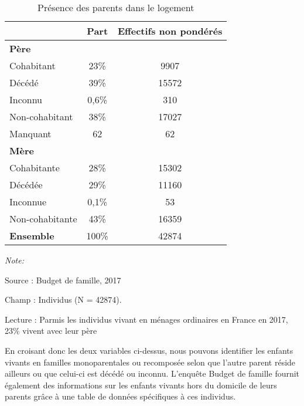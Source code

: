 \documentclass[
  12pt,
]{book}
\begin{document}
\begin{table}[!h]
\centering\centering
\caption{\label{tab:SIT-PARENTS}Présence des parents dans le logement}
\centering
\fontsize{8}{10}\selectfont
\begin{threeparttable}
\begin{tabular}[t]{lcc}
\toprule
 & \textbf{Part} & \textbf{Effectifs non pondérés}\\
\midrule
\textbf{Père} &  & \\
\hspace{1em}Cohabitant & 23\% & 9907\\
\hspace{1em}Décédé & 39\% & 15572\\
\hspace{1em}Inconnu & 0,6\% & 310\\
\hspace{1em}Non-cohabitant & 38\% & 17027\\
\addlinespace
\hspace{1em}Manquant & 62 & 62\\
\textbf{Mère} &  & \\
\hspace{1em}Cohabitante & 28\% & 15302\\
\hspace{1em}Décédée & 29\% & 11160\\
\hspace{1em}Inconnue & 0,1\% & 53\\
\addlinespace
\hspace{1em}Non-cohabitante & 43\% & 16359\\
\textbf{Ensemble} & 100\% & 42874\\
\bottomrule
\end{tabular}
\begin{tablenotes}
\item \textit{Note: } 
\item Source : Budget de famille, 2017
\item Champ : Individus (N = 42874).
\item Lecture : Parmis les individus vivant en ménages ordinaires en France en 2017, 23\% vivent avec leur père
\end{tablenotes}
\end{threeparttable}
\end{table}

En croisant donc les deux variables ci-dessus, nous pouvons identifier
les enfants vivants en familles monoparentales ou recomposée selon que
l'autre parent réside ailleurs ou que celui-ci est décédé ou inconnu.
L'enquête Budget de famille fournit également des informations sur les
enfants vivants hors du domicile de leurs parents grâce à une table de
données spécifiques à ces individus.
\end{document}
